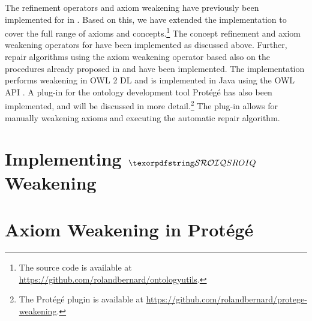 
The refinement operators and axiom weakening have previously been implemented for \ALC in \cite{troquard2018repairing}. Based on this, we have extended the implementation to cover the full range of \SROIQ axioms and concepts.\footnote{The source code is available at \url{https://github.com/rolandbernard/ontologyutils}.} The concept refinement and axiom weakening operators for \SROIQ have been implemented as discussed above. Further, repair algorithms using the axiom weakening operator based also on the procedures already proposed in \cite{troquard2018repairing} and \cite{confalonieri2020towards} have been implemented. The implementation performs weakening in OWL 2 DL \cite{motik2012ontology} and is implemented in Java using the OWL API \cite{horridge2011owl,owlapi,matentzoglu2016introduction}. A plug-in for the ontology development tool Protégé has also been implemented, and will be discussed in more detail.\footnote{The Protégé plugin is available at \url{https://github.com/rolandbernard/protege-weakening}.} The plug-in allows for manually weakening axioms and executing the automatic repair algorithm.

\section{Implementing \texorpdfstring{$\SROIQ$}{SROIQ} Weakening}



\section{Axiom Weakening in Protégé}\label{protege}


